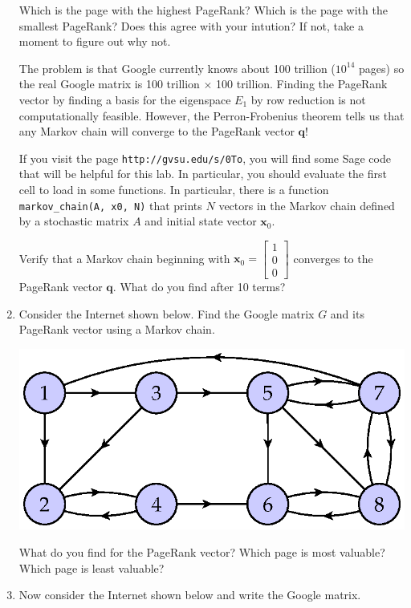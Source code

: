 \documentclass[12pt]{article}
\newcommand{\vs}[1]{\vspace{#1in}}
\newcommand{\qvec}{{\mathbf q}}
\newcommand{\xvec}{{\mathbf x}}
\newcommand{\threevec}[3]{\left[\begin{array}{r}#1 \\ #2 \\ #3
  \end{array}\right]}
\begin{document}
\begin{enumerate}
  \vs{1}
  Which is the page with the highest PageRank?  Which is the page with
  the smallest PageRank?  Does this agree with your intution?  If not,
  take a moment to figure out why not.

  \vs{1}
  The problem is that Google currently knows about 100 trillion
  ($10^{14}$ pages) so the real Google matrix is 100 trillion $\times$
  100 trillion.  Finding the PageRank vector by finding a basis for
  the eigenspace $E_1$ by row reduction is not computationally
  feasible.  However, the Perron-Frobenius theorem tells us that any
  Markov chain will converge to the PageRank vector $\qvec$!

  \medskip
  If you visit the page {\tt http://gvsu.edu/s/0To}, you will find
  some Sage code that will be helpful for this lab.  In particular,
  you should evaluate the first cell to load in some functions.  In
  particular, there is a function {\tt markov\_chain(A, x0, N)} that
  prints $N$ vectors in the Markov chain defined by a stochastic
  matrix $A$ and initial state vector $\xvec_0$.

  \medskip
  Verify that a Markov chain beginning with $\xvec_0 = \threevec100$
  converges to the PageRank vector $\qvec$.  What do you find after 10
  terms?  

  \vs{1}
\item Consider the Internet shown below.  Find the Google matrix $G$
  and its PageRank vector using a Markov chain.

  \begin{center}
    \includegraphics{google-irreducible.eps}
  \end{center}

  What do you find for the PageRank vector?  Which page is most
  valuable?  Which page is least valuable?

  \vs{1}
\item Now consider the Internet shown below and write the Google
  matrix.


\end{enumerate}
\end{document}

